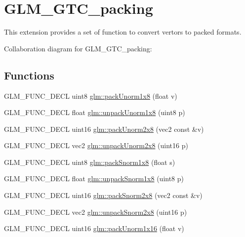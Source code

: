 \hypertarget{group__gtc__packing}{\section{G\-L\-M\-\_\-\-G\-T\-C\-\_\-packing}
\label{group__gtc__packing}
}


This extension provides a set of function to convert vertors to packed formats.  


Collaboration diagram for G\-L\-M\-\_\-\-G\-T\-C\-\_\-packing\-:
\subsection*{Functions}
\begin{DoxyCompactItemize}
\item 
G\-L\-M\-\_\-\-F\-U\-N\-C\-\_\-\-D\-E\-C\-L uint8 \hyperlink{group__gtc__packing_ga2f9963e5d762b10085b280d3662017ba}{glm\-::pack\-Unorm1x8} (float v)
\item 
G\-L\-M\-\_\-\-F\-U\-N\-C\-\_\-\-D\-E\-C\-L float \hyperlink{group__gtc__packing_ga32f3f2642df2ea87449d59fb614a8305}{glm\-::unpack\-Unorm1x8} (uint8 p)
\item 
G\-L\-M\-\_\-\-F\-U\-N\-C\-\_\-\-D\-E\-C\-L uint16 \hyperlink{group__gtc__packing_ga833288fc0d4a79f19d0db75a6843bfe6}{glm\-::pack\-Unorm2x8} (vec2 const \&v)
\item 
G\-L\-M\-\_\-\-F\-U\-N\-C\-\_\-\-D\-E\-C\-L vec2 \hyperlink{group__gtc__packing_ga96ce0c24339ee676e28a027fffd1edf6}{glm\-::unpack\-Unorm2x8} (uint16 p)
\item 
G\-L\-M\-\_\-\-F\-U\-N\-C\-\_\-\-D\-E\-C\-L uint8 \hyperlink{group__gtc__packing_ga26b6cd7a35c46c4b6a342f3b97b47423}{glm\-::pack\-Snorm1x8} (float s)
\item 
G\-L\-M\-\_\-\-F\-U\-N\-C\-\_\-\-D\-E\-C\-L float \hyperlink{group__gtc__packing_ga6f2bebf536fbf7c8b97d4b306bb3354e}{glm\-::unpack\-Snorm1x8} (uint8 p)
\item 
G\-L\-M\-\_\-\-F\-U\-N\-C\-\_\-\-D\-E\-C\-L uint16 \hyperlink{group__gtc__packing_ga05d08a82923166ec7cd5d0e6154c9953}{glm\-::pack\-Snorm2x8} (vec2 const \&v)
\item 
G\-L\-M\-\_\-\-F\-U\-N\-C\-\_\-\-D\-E\-C\-L vec2 \hyperlink{group__gtc__packing_ga27f30f0281b88e152b0895f5e2ead878}{glm\-::unpack\-Snorm2x8} (uint16 p)
\item 
G\-L\-M\-\_\-\-F\-U\-N\-C\-\_\-\-D\-E\-C\-L uint16 \hyperlink{group__gtc__packing_ga60c7d915f5653559ae02c2f79a8c5c1d}{glm\-::pack\-Unorm1x16} (float v)

\end{DoxyCompactItemize}
